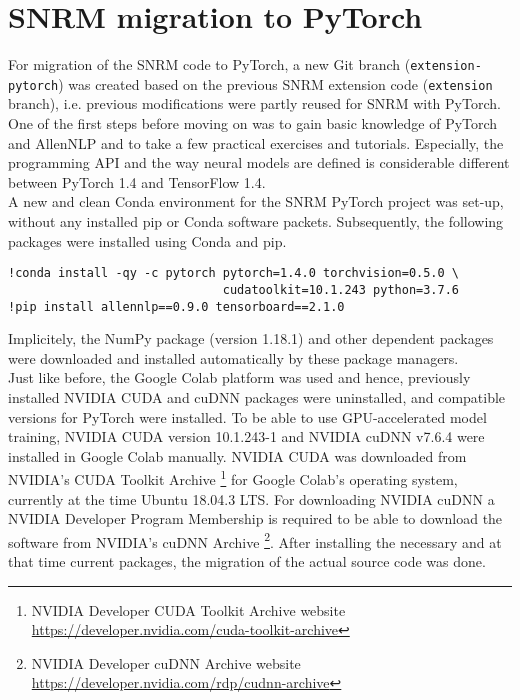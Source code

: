 \section{SNRM migration to PyTorch}

For migration of the SNRM code to PyTorch, a new Git branch (\texttt{extension-pytorch})
    was created based on the previous SNRM extension code (\texttt{extension} branch), 
    i.e. previous modifications were partly reused for SNRM with PyTorch.
One of the first steps before moving on was to gain basic knowledge of PyTorch and AllenNLP
    and to take a few practical exercises and tutorials.
Especially, the programming API and the way neural models are defined is considerable
    different between PyTorch 1.4 and TensorFlow 1.4.\\

A new and clean Conda environment for the SNRM PyTorch project was set-up,
    without any installed pip or Conda software packets. 
Subsequently, the following packages were installed using Conda and pip.
\begin{verbatim}
!conda install -qy -c pytorch pytorch=1.4.0 torchvision=0.5.0 \
                              cudatoolkit=10.1.243 python=3.7.6
!pip install allennlp==0.9.0 tensorboard==2.1.0
\end{verbatim}
Implicitely, the NumPy package (version 1.18.1) and other dependent packages were downloaded
    and installed automatically by these package managers. \\
Just like before, the Google Colab platform was used and hence, previously 
    installed NVIDIA CUDA and cuDNN packages were uninstalled,
    and compatible versions for PyTorch were installed.
To be able to use GPU-accelerated model training, NVIDIA CUDA version 10.1.243-1 
    and NVIDIA cuDNN v7.6.4 were installed in Google Colab manually.
NVIDIA CUDA was downloaded from NVIDIA's CUDA Toolkit Archive
    \footnote{NVIDIA Developer CUDA Toolkit Archive website \url{https://developer.nvidia.com/cuda-toolkit-archive}}
    for Google Colab's operating system, currently at the time Ubuntu 18.04.3 LTS.
For downloading NVIDIA cuDNN a NVIDIA Developer Program Membership is required to be able to
    download the software from NVIDIA's cuDNN Archive
    \footnote{NVIDIA Developer cuDNN Archive website \url{https://developer.nvidia.com/rdp/cudnn-archive}}.
After installing the necessary and at that time current packages, the migration of the actual source code
    was done.

